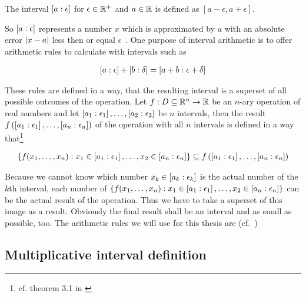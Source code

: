 \begin{definition}
  The interval $\an{a}$ for $\epsilon \in \Rplus$ and $a\in \R$ is defined as $[a-\epsilon,a+\epsilon]$.
\end{definition}

So $\an{a}$ represents a number $x$ which is approximated by $a$ with an absolute error $\abs{x-a}$ less then or equal $\epsilon$~\cite[p.~5]{moore:methods}. One purpose of interval arithmetic is to offer arithmetic rules to calculate with intervals such as~\cite[pp.~19-20]{kulla}

\begin{align}
  \an{a}+\an[\delta]{b} = \an[\epsilon+\delta]{a+b}
\end{align}

These rules are defined in a way, that the resulting interval is a superset of all possible outcomes of the operation. Let $f:D\subseteq\R^n\to\R$ be an $n$-ary operation of real numbers and let $\an[\epsilon_1]{a_1},\ldots,\an[\epsilon_2]{a_2}$ be $n$ intervals, then the result  $f\left(\an[\epsilon_1]{a_1},\ldots,\an[\epsilon_n]{a_n}\right)$ of the operation with all $n$ intervals is defined in a way that\footnote{cf. theorem 3.1 in \cite[p. 21]{moore:methods}} 

\begin{align}
  \left\{f(x_1,\ldots,x_n):x_1\in\an[\epsilon_1]{a_1},\ldots,x_2\in\an[\epsilon_n]{a_n}\right\} \subseteq f\left(\an[\epsilon_1]{a_1},\ldots,\an[\epsilon_n]{a_n}\right)
\end{align}

Because we cannot know which number $x_k \in \an[\epsilon_k]{a_k}$ is the actual number of the $k$th interval, each number of $\left\{f(x_1,\ldots,x_n):x_1\in\an[\epsilon_1]{a_1},\ldots,x_2\in\an[\epsilon_n]{a_n}\right\}$ can be the actual result of the operation. Thus we have to take a superset of this image as a result. Obviously the final result shall be an interval and as small as possible, too. The arithmetic rules we will use for this thesis are (cf.~\cite[pp.~19-24.]{kulla})

\begin{theorem}

\end{theorem}

\subsection{Multiplicative interval definition}

